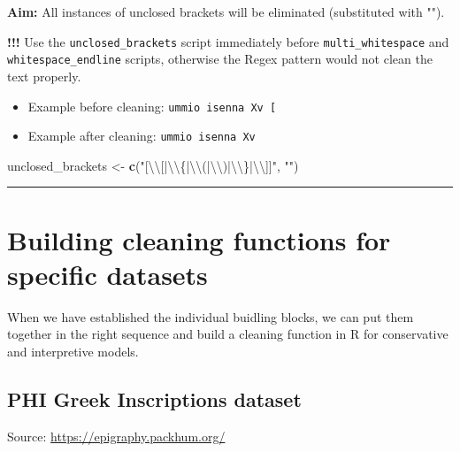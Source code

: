 \documentclass[]{article}
\newenvironment{Shaded}{\begin{snugshade}}{\end{snugshade}}
\newcommand{\CharTok}[1]{\textcolor[rgb]{0.31,0.60,0.02}{#1}}
\newcommand{\KeywordTok}[1]{\textcolor[rgb]{0.13,0.29,0.53}{\textbf{#1}}}
\newcommand{\NormalTok}[1]{#1}
\newcommand{\StringTok}[1]{\textcolor[rgb]{0.31,0.60,0.02}{#1}}
\providecommand{\tightlist}{%
  \setlength{\itemsep}{0pt}\setlength{\parskip}{0pt}}
\begin{document}
\textbf{Aim:} All instances of unclosed brackets will be eliminated
(substituted with "").

\textbf{!!!} Use the \texttt{unclosed\_brackets} script immediately
before \texttt{multi\_whitespace} and \texttt{whitespace\_endline}
scripts, otherwise the Regex pattern would not clean the text properly.

\begin{itemize}
\tightlist
\item
  Example before cleaning: \texttt{ummio\ isenna\ Xv\ {[}}
\item
  Example after cleaning: \texttt{ummio\ isenna\ Xv}
\end{itemize}

\begin{Shaded}
\begin{Highlighting}[]
\NormalTok{unclosed_brackets <-}\StringTok{ }\KeywordTok{c}\NormalTok{(}\StringTok{"[}\CharTok{\textbackslash{}\textbackslash{}}\StringTok{[|}\CharTok{\textbackslash{}\textbackslash{}}\StringTok{\{|}\CharTok{\textbackslash{}\textbackslash{}}\StringTok{(|}\CharTok{\textbackslash{}\textbackslash{}}\StringTok{)|}\CharTok{\textbackslash{}\textbackslash{}}\StringTok{\}|}\CharTok{\textbackslash{}\textbackslash{}}\StringTok{]]"}\NormalTok{, }\StringTok{""}\NormalTok{)}
\end{Highlighting}
\end{Shaded}

\begin{center}\rule{0.5\linewidth}{0.5pt}\end{center}

\hypertarget{building-cleaning-functions-for-specific-datasets}{%
\section{Building cleaning functions for specific
datasets}\label{building-cleaning-functions-for-specific-datasets}}

When we have established the individual buidling blocks, we can put them
together in the right sequence and build a cleaning function in R for
conservative and interpretive models.

\hypertarget{phi-greek-inscriptions-dataset}{%
\subsection{PHI Greek Inscriptions
dataset}\label{phi-greek-inscriptions-dataset}}

Source: \url{https://epigraphy.packhum.org/}
\end{document}
